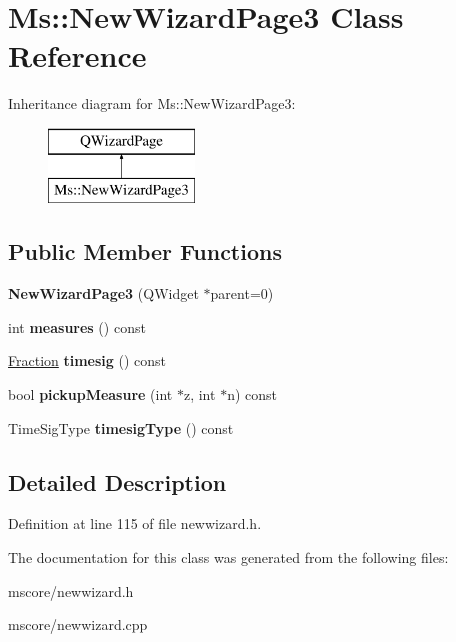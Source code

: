 \hypertarget{class_ms_1_1_new_wizard_page3}{}\section{Ms\+:\+:New\+Wizard\+Page3 Class Reference}
\label{class_ms_1_1_new_wizard_page3}
Inheritance diagram for Ms\+:\+:New\+Wizard\+Page3\+:\begin{figure}[H]
\begin{center}
\leavevmode
\includegraphics[height=2.000000cm]{class_ms_1_1_new_wizard_page3}
\end{center}
\end{figure}
\subsection*{Public Member Functions}
\begin{DoxyCompactItemize}
\item 
\mbox{\label{class_ms_1_1_new_wizard_page3_a01ac6dabeb309764120d0811ceff3f3a}} 
{\bfseries New\+Wizard\+Page3} (Q\+Widget $\ast$parent=0)
\item 
\mbox{\label{class_ms_1_1_new_wizard_page3_a84a2174fae36e54ac482a3aa1cb8619d}} 
int {\bfseries measures} () const
\item 
\mbox{\label{class_ms_1_1_new_wizard_page3_a837681998cc6612514c8cfbb5408e83b}} 
\hyperlink{class_ms_1_1_fraction}{Fraction} {\bfseries timesig} () const
\item 
\mbox{\label{class_ms_1_1_new_wizard_page3_a4ed0c0bf3f854b765cb92cb0309805d2}} 
bool {\bfseries pickup\+Measure} (int $\ast$z, int $\ast$n) const
\item 
\mbox{\label{class_ms_1_1_new_wizard_page3_a5d851cb136cc4d7f0523ed3d5b1cf1bc}} 
Time\+Sig\+Type {\bfseries timesig\+Type} () const
\end{DoxyCompactItemize}


\subsection{Detailed Description}


Definition at line 115 of file newwizard.\+h.



The documentation for this class was generated from the following files\+:\begin{DoxyCompactItemize}
\item 
mscore/newwizard.\+h\item 
mscore/newwizard.\+cpp\end{DoxyCompactItemize}
